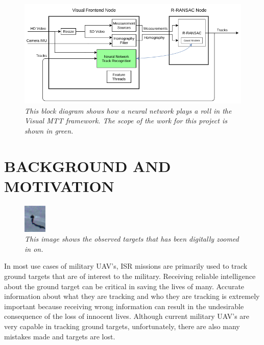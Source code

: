 \documentclass[letterpaper, 10 pt, conference]{ieeeconf}  %
\begin{document}
\begin{figure}
	\begin{center}
		\includegraphics[width=.85\textwidth]{rransac.png}
		\caption{\textit{This block diagram shows how a neural network plays a roll in the Visual MTT framework. The scope of the work for this project is shown in green.}} 
		\label{fig:rransac}
	\end{center}
\end{figure}
\section{BACKGROUND AND MOTIVATION} \label{BACKGROUND}

\begin{figure}
	\begin{center}
		\includegraphics[width=.45\textwidth]{gimbal_zoomed.png}
		\caption{\textit{This image shows the observed targets that has been digitally zoomed in on.}} 
		\label{fig:gimbal_zoomed}
	\end{center}
\end{figure}


In most use cases of military UAV's, ISR missions are primarily used to track ground targets that are of interest to the military. Receiving reliable intelligence about the ground target can be critical in saving the lives of many. Accurate information about what they are tracking and who they are tracking is extremely important because receiving wrong information can result in the undesirable consequence of the loss of innocent lives. Although current military UAV's are very capable in tracking ground targets, unfortunately, there are also many mistakes made and targets are lost. 
\end{document}
